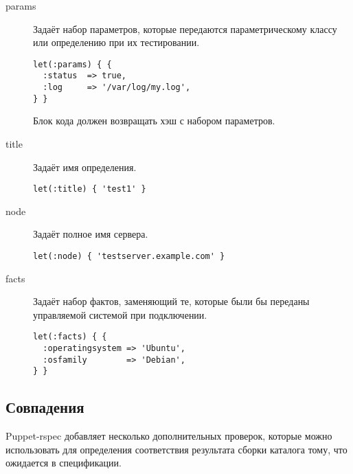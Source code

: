 \begin{description}

\item[params]
Задаёт набор параметров, которые передаются параметрическому классу или определению при их тестировании.
\begin{lstlisting}
let(:params) { {
  :status  => true,
  :log     => '/var/log/my.log',
} }
\end{lstlisting}
Блок кода должен возвращать хэш с набором параметров.

\item[title]
Задаёт имя определения.
\begin{lstlisting}
let(:title) { 'test1' }
\end{lstlisting}

\item[node]
Задаёт полное имя сервера.
\begin{lstlisting}
let(:node) { 'testserver.example.com' }
\end{lstlisting}

\item[facts]
Задаёт набор фактов, заменяющий те, которые были бы переданы управляемой системой при подключении.
\begin{lstlisting}
let(:facts) { {
  :operatingsystem => 'Ubuntu',
  :osfamily        => 'Debian',
} }
\end{lstlisting}

\end{description}

\subsection{Совпадения}

Puppet-rspec добавляет несколько дополнительных проверок, которые можно использовать для определения соответствия результата сборки каталога тому, что ожидается в спецификации.

